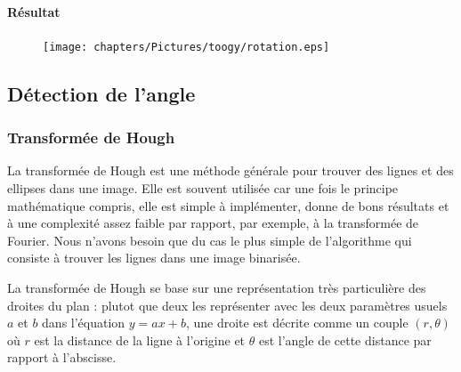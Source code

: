 \paragraph{Résultat}

\begin{figure}
  \centering
  \texttt{[image: chapters/Pictures/toogy/rotation.eps]}
\end{figure}

\subsection{Détection de l'angle}

\subsubsection{Transformée de Hough}

La transformée de Hough est une méthode générale pour trouver des lignes et des ellipses dans une image. Elle est souvent utilisée car une fois le principe mathématique compris, elle est simple à implémenter, donne de bons résultats et à une complexité assez faible par rapport, par exemple, à la transformée de Fourier. Nous n'avons besoin que du cas le plus simple de l'algorithme qui consiste à trouver les lignes dans une image binarisée.

La transformée de Hough se base sur une représentation très particulière des droites du plan : plutot que deux les représenter avec les deux paramètres usuels $a$ et $b$ dans l'équation $y = ax + b$, une droite est décrite comme un couple $(r, \theta)$ où $r$ est la distance de la ligne à l'origine et $\theta$ est l'angle de cette distance par rapport à l'abscisse.

